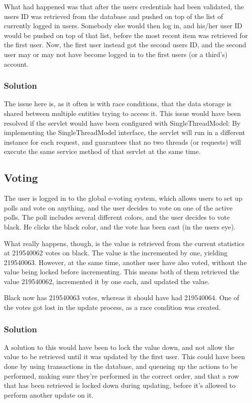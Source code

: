 What had happened was that after the users credentials had been validated, the users ID was retrieved from the database and pushed on top of the list of currently logged in users. Somebody else would then log in, and his/her user ID would be pushed on top of that list, before the most recent item was retrieved for the first user. Now, the first user instead got the second users ID, and the second user may or may not have become logged in to the first users (or a third's) account. 

\subsubsection{Solution}
The issue here is, as it often is with race conditions, that the data storage is shared between multiple entities trying to access it. This issue would have been resolved if the servlet would have been configured with SingleThreadModel: By implementing the SingleThreadModel interface, the servlet will run in a different instance for each request, and guarantees that no two threads (or requests) will execute the same service method of that servlet at the same time. \cite{singlethreadmodel}



\subsection{Voting}
The user is logged in to the global e-voting system, which allows users to set up polls and vote on anything, and the user decides to vote on one of the active polls. The poll includes several different colors, and the user decides to vote black. He clicks the black color, and the vote has been cast (in the users eye).

What really happens, though, is the value is retrieved from the current statistics at 219540062 votes on black. The value is the incremented by one, yielding 219540063. However, at the same time, another user have also voted, without the value being locked before incrementing. This means both of them retrieved the value 219540062, incremented it by one each, and updated the value.

Black now has 219540063 votes, whereas it should have had 219540064. One of the votes got lost in the update process, as a race condition was created.

\subsubsection{Solution}

A solution to this would have been to lock the value down, and not allow the value to be retrieved until it was updated by the first user. This could have been done by using transactions in the database, and queueing up the actions to be performed, making sure they're performed in the correct order, and that a row that has been retrieved is locked down during updating, before it's allowed to perform another update on it. 
